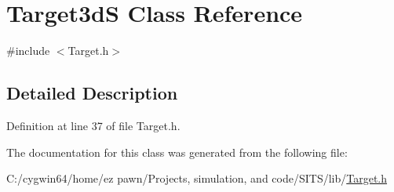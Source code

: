 \hypertarget{class_target3d_s}{}\section{Target3dS Class Reference}
\label{class_target3d_s}


{\ttfamily \#include $<$Target.\+h$>$}



\subsection{Detailed Description}


Definition at line 37 of file Target.\+h.



The documentation for this class was generated from the following file\+:\begin{DoxyCompactItemize}
\item 
C\+:/cygwin64/home/ez pawn/\+Projects, simulation, and code/\+S\+I\+T\+S/lib/\hyperlink{_target_8h}{Target.\+h}\end{DoxyCompactItemize}
